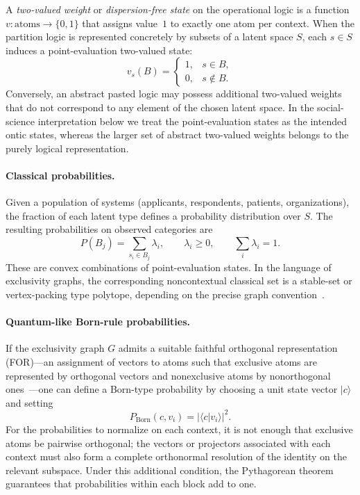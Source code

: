 \documentclass[aps,pra,twocolumn,superscriptaddress,floatfix,longbibliography]{revtex4-2}
\begin{document}
A \emph{two-valued weight} or \emph{dispersion-free state} on the
operational logic is a function
$v \colon \text{atoms} \to \{0,1\}$ that assigns value~$1$ to
exactly one atom per context. When the partition logic is represented
concretely by subsets of a latent space $S$, each $s\in S$ induces a
point-evaluation two-valued state:
\[
v_s(B)=
\begin{cases}
1, & s\in B,\\
0, & s\notin B.
\end{cases}
\]
Conversely, an abstract pasted logic may possess additional
two-valued weights that do not correspond to any element of the
chosen latent space. In the social-science interpretation below we
treat the point-evaluation states as the intended ontic states,
whereas the larger set of abstract two-valued weights belongs to
the purely logical representation.

\paragraph{Classical probabilities.}
Given a population of systems (applicants, respondents, patients,
organizations), the fraction of each latent type defines a
probability distribution over $S$. The resulting probabilities on
observed categories are
\[
P(B_j) = \sum_{s_i\in B_j}\lambda_i,
\qquad
\lambda_i\geq 0,\qquad
\sum_i \lambda_i=1.
\]
These are convex combinations of point-evaluation states. In the
language of exclusivity graphs, the corresponding noncontextual
classical set is a stable-set or vertex-packing type polytope,
depending on the precise graph convention~\cite{GroetschelLovaszSchrijver1986}.

\paragraph{Quantum-like Born-rule probabilities.}
If the exclusivity graph $G$ admits a suitable faithful orthogonal
representation (FOR)---an assignment of vectors to atoms such that
exclusive atoms are represented by orthogonal vectors and
nonexclusive atoms by nonorthogonal ones~\cite{lovasz-79,
Cabello-2014-gtatqc}---one can define a Born-type probability by
choosing a unit state vector $|c\rangle$ and setting
\begin{equation}
P_{\text{Born}}(c,v_i)=|\langle c|v_i\rangle|^2.
\label{eq:born}
\end{equation}
For the probabilities to normalize on each context, it is not enough
that exclusive atoms be pairwise orthogonal; the vectors or
projectors associated with each context must also form a complete
orthonormal resolution of the identity on the relevant subspace.
Under this additional condition, the Pythagorean theorem guarantees
that probabilities within each block add to one.
\end{document}
